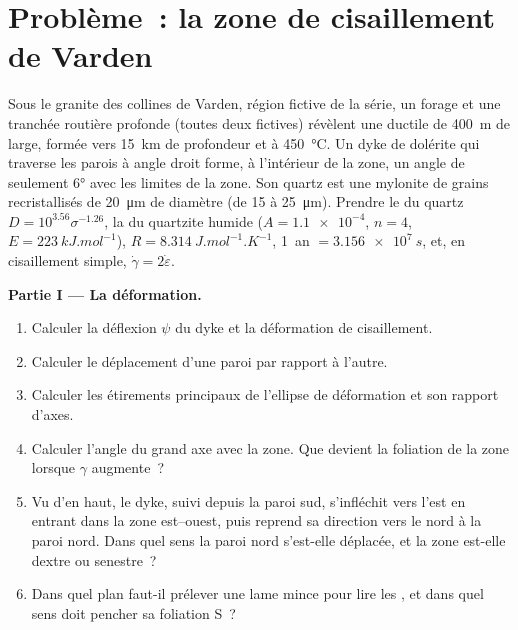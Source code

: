 \section{Problème~: la zone de cisaillement de Varden}

\begin{problem}
\label{pb:b3:deformation-mechanisms:1}
Sous le granite des collines de Varden, région fictive de la série, un
forage et une tranchée routière profonde (toutes deux fictives) révèlent une  ductile de \qty{400}{m} de large, formée vers \qty{15}{km} de profondeur et à \qty{450}{\celsius}.
Un dyke de dolérite qui traverse les parois à angle droit forme, à l'intérieur de la zone,
un angle de seulement \ang{6} avec les limites de la zone. Son quartz est une mylonite
de grains recristallisés de \qty{20}{\micro m} de diamètre (de 15 à
\qty{25}{\micro m}). Prendre le  du quartz $D = 10^{3.56}\sigma^{-1.26}$,
la  du quartzite humide ($A = \num{1.1e-4}$, $n = 4$, $E =
\qty{223}{kJ.mol^{-1}}$), $R = \qty{8.314}{J.mol^{-1}.K^{-1}}$, \qty{1}{an} $=
\qty{3.156e7}{s}$, et, en cisaillement simple, $\dot\gamma = 2\dot\varepsilon$.

\medskip\noindent\textbf{Partie I --- La déformation.}
\begin{enumerate}
  \item Calculer la déflexion $\psi$ du dyke et la déformation de cisaillement.
  \item Calculer le déplacement d'une paroi par rapport à l'autre.
  \item Calculer les étirements principaux de l'ellipse de déformation et son
        rapport d'axes.
  \item Calculer l'angle du grand axe avec la zone. Que devient la
        foliation de la zone lorsque $\gamma$ augmente~?
  \item Vu d'en haut, le dyke, suivi depuis la paroi sud, s'infléchit
        vers l'est en entrant dans la zone est--ouest, puis reprend sa
        direction vers le nord à la paroi nord. Dans quel sens la
        paroi nord s'est-elle déplacée, et la zone est-elle dextre ou senestre~?
  \item Dans quel plan faut-il prélever une lame mince pour lire les , et dans quel sens doit pencher sa foliation S~?
\end{enumerate}


\end{problem}
